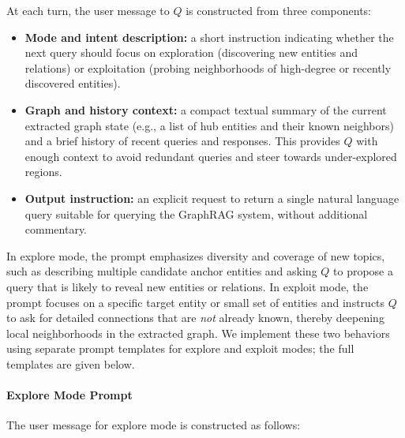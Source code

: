 At each turn, the user message to $Q$ is constructed from three components:
\begin{itemize}
    \item \textbf{Mode and intent description:} a short instruction indicating whether the next query should focus on exploration (discovering new entities and relations) or exploitation (probing neighborhoods of
    high-degree or recently discovered entities).
    \item \textbf{Graph and history context:} a compact textual summary of the current extracted graph state (e.g., a list of hub entities and their known neighbors) and a brief history of recent queries and responses. This provides $Q$ with enough context to avoid redundant queries and steer towards under-explored regions.
    \item \textbf{Output instruction:} an explicit request to return a single natural language query suitable for querying the GraphRAG system, without additional commentary.
\end{itemize}

In \textsf{explore} mode, the prompt emphasizes diversity and coverage of new topics, such as describing multiple candidate anchor entities and asking $Q$ to propose a query that is likely to reveal new entities or relations. 
In \textsf{exploit} mode, the prompt focuses on a specific target entity or small set of entities and instructs $Q$ to ask for detailed connections that are \emph{not} already known, thereby deepening local neighborhoods in the extracted graph.
We implement these two behaviors using separate prompt templates for explore and exploit modes; the full templates are given below.


\paragraph{Explore Mode Prompt}
The user message for \textsf{explore} mode is constructed as follows:

